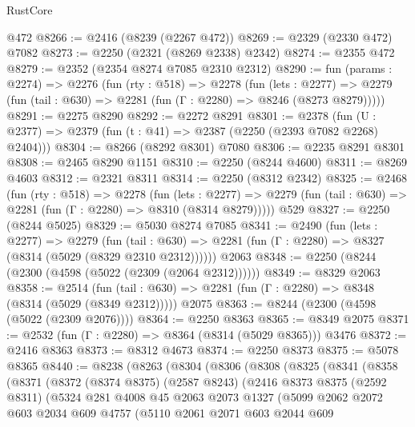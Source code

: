\begin{lexlean}{RustCore}
\begin{coremodule}
    @472
@8266 := @2416 (@8239 (@2267 @472))
@8269 := @2329 (@2330 @472) @7082
@8273 := @2250 (@2321 (@8269 @2338) @2342)
@8274 := @2355 @472
@8279 := @2352 (@2354 @8274 @7085 @2310 @2312)
@8290 := fun (params : @2274) =>
  @2276
    (fun (rty : @518) =>
    @2278
      (fun (lets : @2277) =>
      @2279 (fun (tail : @630) => @2281 (fun (Γ : @2280) => @8246 (@8273 @8279)))))
@8291 := @2275 @8290
@8292 := @2272 @8291
@8301 := @2378 (fun (U : @2377) => @2379 (fun (t : @41) => @2387 (@2250 (@2393 @7082 @2268) @2404)))
@8304 := @8266 (@8292 @8301) @7080
@8306 := @2235 @8291 @8301
@8308 := @2465 @8290 @1151
@8310 := @2250 (@8244 @4600)
@8311 := @8269 @4603
@8312 := @2321 @8311
@8314 := @2250 (@8312 @2342)
@8325 := @2468
    (fun (rty : @518) =>
    @2278
      (fun (lets : @2277) =>
      @2279 (fun (tail : @630) => @2281 (fun (Γ : @2280) => @8310 (@8314 @8279)))))
    @529
@8327 := @2250 (@8244 @5025)
@8329 := @5030 @8274 @7085
@8341 := @2490
    (fun (lets : @2277) =>
    @2279
      (fun (tail : @630) => @2281 (fun (Γ : @2280) => @8327 (@8314 (@5029 (@8329 @2310 @2312))))))
    @2063
@8348 := @2250 (@8244 (@2300 (@4598 (@5022 (@2309 (@2064 @2312))))))
@8349 := @8329 @2063
@8358 := @2514
    (fun (tail : @630) => @2281 (fun (Γ : @2280) => @8348 (@8314 (@5029 (@8349 @2312)))))
    @2075
@8363 := @8244 (@2300 (@4598 (@5022 (@2309 @2076))))
@8364 := @2250 @8363
@8365 := @8349 @2075
@8371 := @2532 (fun (Γ : @2280) => @8364 (@8314 (@5029 @8365))) @3476
@8372 := @2416 @8363
@8373 := @8312 @4673
@8374 := @2250 @8373
@8375 := @5078 @8365
@8440 := @8238
    (@8263
      (@8304
        (@8306
          (@8308
            (@8325
              (@8341
                (@8358
                  (@8371
                    (@8372
                      (@8374 @8375)
                      (@2587 @8243)
                      (@2416
                        @8373
                        @8375
                        (@2592 @8311)
                        (@5324
                          @281
                          @4008
                          @45
                          @2063
                          @2073
                          @1327
                          (@5099
                            @2062
                            @2072
                            @603
                            @2034
                            @609
                            @4757
                            (@5110
                              @2061
                              @2071
                              @603
                              @2044
                              @609

\end{coremodule}
\end{lexlean}
